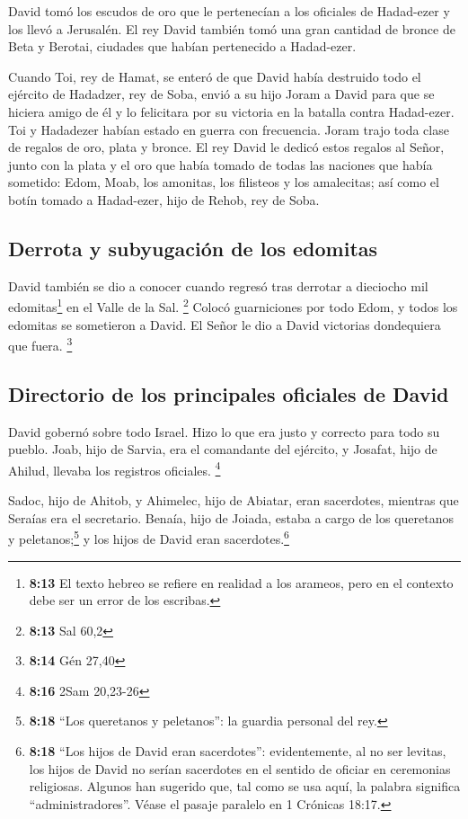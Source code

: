  David tomó los escudos de oro que le pertenecían a los
oficiales de Hadad-ezer y los llevó a Jerusalén.  El rey
David también tomó una gran cantidad de bronce de Beta y Berotai,
ciudades que habían pertenecido a Hadad-ezer.

 Cuando Toi, rey de Hamat, se enteró de que David había
destruido todo el ejército de Hadadzer, rey de Soba, 
envió a su hijo Joram a David para que se hiciera amigo de él y lo
felicitara por su victoria en la batalla contra Hadad-ezer. Toi y
Hadadezer habían estado en guerra con frecuencia. Joram trajo toda clase
de regalos de oro, plata y bronce.  El rey David le
dedicó estos regalos al Señor, junto con la plata y el oro que había
tomado de todas las naciones que había sometido:  Edom,
Moab, los amonitas, los filisteos y los amalecitas; así como el botín
tomado a Hadad-ezer, hijo de Rehob, rey de Soba.

\hypertarget{derrota-y-subyugaciuxf3n-de-los-edomitas}{%
\subsection{Derrota y subyugación de los
edomitas}\label{derrota-y-subyugaciuxf3n-de-los-edomitas}}

 David también se dio a conocer cuando regresó tras
derrotar a dieciocho mil edomitas\footnote{\textbf{8:13} El texto hebreo
  se refiere en realidad a los arameos, pero en el contexto debe ser un
  error de los escribas.} en el Valle de la Sal. \footnote{\textbf{8:13}
  Sal 60,2}  Colocó guarniciones por todo Edom, y todos
los edomitas se sometieron a David. El Señor le dio a David victorias
dondequiera que fuera. \footnote{\textbf{8:14} Gén 27,40}

\hypertarget{directorio-de-los-principales-oficiales-de-david}{%
\subsection{Directorio de los principales oficiales de
David}\label{directorio-de-los-principales-oficiales-de-david}}

 David gobernó sobre todo Israel. Hizo lo que era justo y
correcto para todo su pueblo.  Joab, hijo de Sarvia, era
el comandante del ejército, y Josafat, hijo de Ahilud, llevaba los
registros oficiales. \footnote{\textbf{8:16} 2Sam 20,23-26}

 Sadoc, hijo de Ahitob, y Ahimelec, hijo de Abiatar, eran
sacerdotes, mientras que Seraías era el secretario. 
Benaía, hijo de Joiada, estaba a cargo de los queretanos y
peletanos;\footnote{\textbf{8:18} ``Los queretanos y peletanos'': la
  guardia personal del rey.} y los hijos de David eran
sacerdotes.\footnote{\textbf{8:18} ``Los hijos de David eran
  sacerdotes'': evidentemente, al no ser levitas, los hijos de David no
  serían sacerdotes en el sentido de oficiar en ceremonias religiosas.
  Algunos han sugerido que, tal como se usa aquí, la palabra significa
  ``administradores''. Véase el pasaje paralelo en 1 Crónicas 18:17.}

